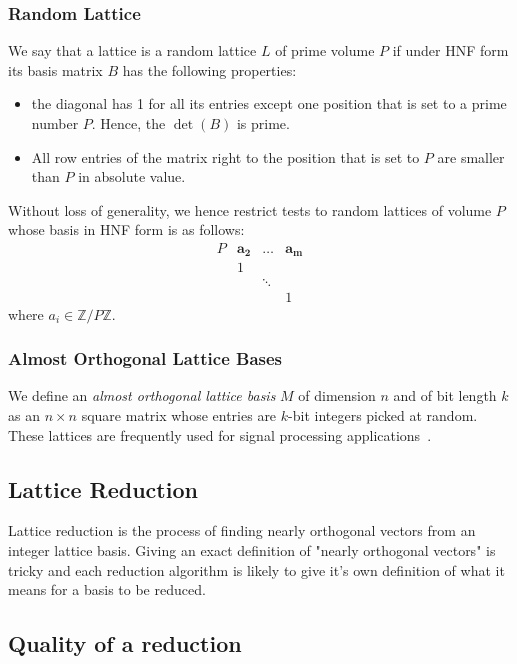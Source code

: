 \documentclass[10pt, a4paper]{article}
\renewcommand{\vec}[1]{\mathbf{#1}}
\begin{document}
\subsubsection{Random Lattice}

We say that a lattice is a random lattice $L$ of prime volume $P$ if under HNF form its basis matrix $B$ has the following properties:

\begin{itemize}
\item the diagonal has 1 for all its entries except one position that is set to a prime number $P$. Hence, the $\det(B)$ is prime.
\item All row entries of the matrix right to the position that is set to $P$ are smaller than $P$ in absolute value.
\end{itemize}

Without loss of generality, we hence restrict tests to random lattices of volume $P$ whose basis in HNF form is as follows:
$$\begin{array}{ccccc}
P & \vec{a_2} & \dots & \vec{a_{m}}\\
& 1&   & \\ 
& & \ddots & \\ 
 & & &1 
\end{array}$$
where $a_i \in \mathbb{Z}/ P\mathbb{Z}$.

\subsubsection{Almost Orthogonal Lattice Bases}

We define an \emph{almost orthogonal lattice basis} $M$ of dimension $n$ and of bit length $k$ as an $n \times n$ square matrix whose entries are $k$-bit integers picked at random. These lattices are frequently used for signal processing applications~\cite{originalJacobiMethodLatticeBasisReduction}.

\subsection{Lattice Reduction}

Lattice reduction is the process of finding nearly orthogonal vectors from an integer lattice basis. Giving an exact definition of "nearly orthogonal vectors" is tricky and each reduction algorithm is likely to give it's own definition of what it means for a basis to be reduced.

\subsection{Quality of a reduction}
\end{document}
